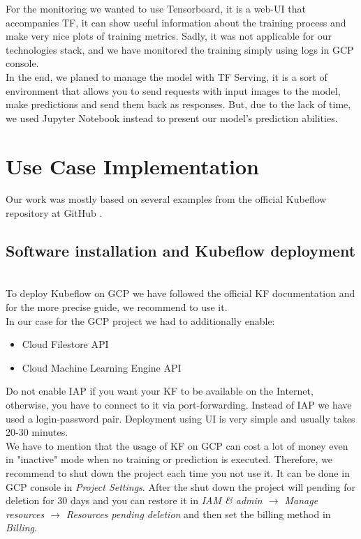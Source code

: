 \documentclass[
	12pt, %
]{fphw}
\begin{document}
For the monitoring we wanted to use Tensorboard, it is a web-UI that accompanies TF, it can show useful information about the training process and make very nice plots of training metrics. Sadly, it was not applicable for our technologies stack, and we have monitored the training simply using logs in GCP console. \\

In the end, we planed to manage the model with TF Serving, it is a sort of environment that allows you to send requests with input images to the model, make predictions and send them back as responses. But, due to the lack of time, we used Jupyter Notebook instead to present our model's prediction abilities.
\ \\
\pagebreak
\section{Use Case Implementation}

Our work was mostly based on several examples from the official Kubeflow repository at GitHub \cite{kf_examples}. 

\subsection*{Software installation and Kubeflow deployment}
\ \\ 

To deploy Kubeflow on GCP we have followed the official KF documentation \cite{kf_on_gcp} and for the more precise guide, we recommend to use it.\\

In our case for the GCP project we had to additionally enable:
\begin{itemize}
	\item Cloud Filestore API
	\item Cloud Machine Learning Engine API
\end{itemize}

Do not enable IAP if you want your KF to be available on the Internet, otherwise, you have to connect to it via port-forwarding. Instead of IAP we have used a login-password pair. Deployment using UI is very simple and usually takes 20-30 minutes.\\

We have to mention that the usage of KF on GCP can cost a lot of money even in "inactive" mode when no training or prediction is executed. Therefore, we recommend to shut down the project each time you not use it. It can be done in GCP console in \textit{Project Settings}. After the shut down the project will pending for deletion for 30 days and you can restore it in \textit{IAM \& admin $\rightarrow$ Manage resources $\rightarrow$ Resources pending deletion} and then set the billing method in \textit{Billing}. \\
\end{document}
